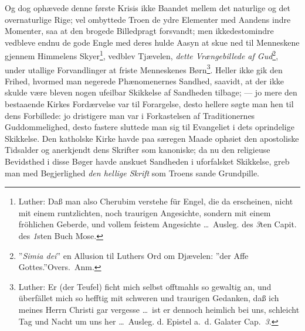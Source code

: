 \documentclass[12pt]{book}
\begin{document}
Og dog ophævede denne første Krisis ikke Baandet mellem det naturlige og det
overnaturlige Rige; vel ombyttede Troen de ydre Elementer med Aandens indre
Momenter, saa at den brogede Billedpragt forsvandt; men ikkedestomindre
vedbleve endnu de gode Engle med deres hulde Aasyn at skue ned til
Menneskene gjennem Himmelens Skyer\footnote{Luther: Daß man also Cherubim
verstehe für Engel, die da erscheinen, nicht mit einem runtzlichten, noch
traurigen Angesichte, sondern mit einem fröhlichen Geberde, und vollem
feistem Angesichte \ldots\ Ausleg. des \textit{3}ten Capit. des \textit{1}sten
Buch Mose.}, vedblev Tjævelen, \emph{dette Vrængebillede af
Gud}\footnote{”\textit{Simia dei}” en Allusion til Luthers Ord om Djævelen:
”der Affe Gottes.”\hfill Overs.\ Anm.}, under utallige Forvandlinger at friste
Menneskenes Børn\footnote{Luther: Er (der Teufel) ficht mich selbst offtmahls
so gewaltig an, und überfället mich so hefftig mit schweren und traurigen
Gedanken, daß ich meines Herrn Christi gar vergesse \ldots\ ist er dennoch
heimlich bei uns, schleicht Tag und Nacht um uns her \ldots\ Ausleg. d.
Epistel a.~d. Galater Cap.~\textit{3}.}.
Heller ikke gik den Frihed, hvormed man negerede Phænomenernes Sandhed,
saavidt, at der ikke skulde være bleven nogen ufeilbar Skikkelse af Sandheden
tilbage; --- jo mere den bestaaende Kirkes Fordærvelse var til Forargelse,
desto hellere søgte man hen til dens Forbillede: jo dristigere man var i
Forkastelsen af Traditionernes Guddommelighed, desto fastere sluttede man sig
til Evangeliet i dets oprindelige Skikkelse. Den katholske Kirke havde paa
særegen Maade ophøiet den apostoliske Tidsalder og anerkjendt dens Skrifter
som kanoniske; da nu den religieuse Bevidsthed i disse Bøger havde anskuet
Sandheden i uforfalsket Skikkelse, greb man med Begjerlighed \emph{den hellige
Skrift} som Troens sande Grundpille.
\end{document}
